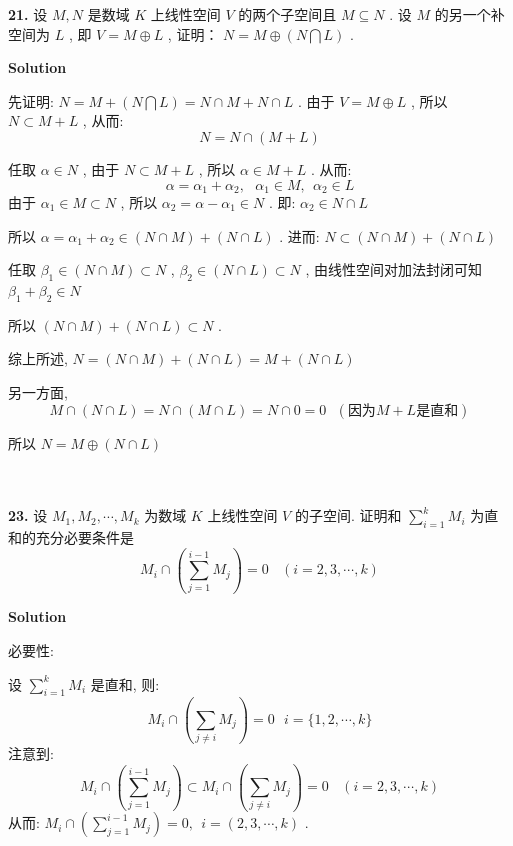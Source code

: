 \documentclass[11pt,a4paper,openany,oneside]{book}
\newcommand\Solution{\noindent\textbf{\textsf{Solution}}\par\medskip}
\begin{document}
\begin{myexample}
	\textbf{21.} 
设 $ M, N $ 是数域 $ K $ 上线性空间 $ V $ 的两个子空间且 $ M \subseteq N $ . 设 $ M $ 的另一个补空间为 $ L $ , 即 $ V = M\oplus L $ , 证明： $ N = M \oplus (N \bigcap L) $ . \\ 

\end{myexample}
\Solution

先证明: $ N = M + (N \bigcap L) = N \cap M + N \cap L $ . 由于 $ V = M \oplus  L $ , 所以 $ N \subset M+L $ , 从而:
 $$  N = N \cap (M + L)  $$ 

任取 $ \alpha \in N $ , 由于 $ N \subset M+L $ , 所以 $ \alpha \in M + L $ . 从而:
 $$  \alpha = \alpha_1 + \alpha_2, \ \ \ \alpha_1 \in M, \ \ \alpha_2 \in L  $$  
由于 $ \alpha_1 \in M \subset N $ , 所以 $ \alpha_2 = \alpha - \alpha_1 \in N $ . 即: $ \alpha_2 \in N \cap L  $ 

所以 $ \alpha = \alpha_1 + \alpha_2 \in (N \cap M) +  (N \cap L) $ . 进而:  $ N \subset (N \cap M) +  (N \cap L)  $ 

任取 $ \beta_1 \in (N \cap M) \subset N  $ ,  $ \beta_2 \in (N \cap L) \subset N $ , 由线性空间对加法封闭可知 $ \beta_1 + \beta_2 \in N $ 

所以 $ (N \cap M) +  (N \cap L) \subset N $ . 

综上所述,  $ N =(N \cap M) +  (N \cap L) = M +  (N \cap L) $ 

另一方面, 
 $$  M \cap (N \cap L ) = N \cap (M \cap L ) = N \cap {0} = 0 \ \ \ (\text{因为}M+L\text{是直和})  $$ 

\hspace{2.5em} 所以 $ N = M \oplus   (N \cap L) $   \\  \\  \\

\begin{myexample}
	\textbf{23.} 
设 $ M_1, M_2, \cdots, M_k $ 为数域 $ K $ 上线性空间 $ V $ 的子空间. 证明和 $ \sum\limits_{i=1}^{k}M_i $ 为直和的充分必要条件是
 $$  M_i \cap \left(\sum\limits_{j=1}^{i-1} M_j \right) = {0} \ \ \ \ (i = 2, 3, \cdots, k)  $$   


\end{myexample}
\Solution 

必要性:

设 $ \sum\limits_{i=1}^k M_i $ 是直和, 则:
 $$  M_i \cap \left(\sum\limits_{j \neq i} M_j \right) = {0} \ \ \ i=\{1, 2, \cdots, k \} $$ 
注意到: 
 $$  M_i \cap \left(\sum\limits_{j=1}^{i-1} M_j \right) \subset  M_i \cap \left(\sum\limits_{j \neq i} M_j \right)={0} \ \ \ \ (i = 2, 3, \cdots, k)  $$ 
从而:  $ M_i \cap \left(\sum\limits_{j=1}^{i-1} M_j \right) = {0}, \ \ i = (2, 3, \cdots, k) $ . \\
\end{document}
